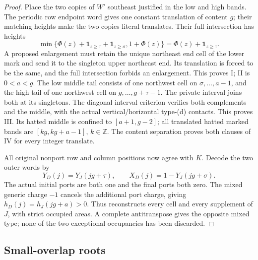\documentclass[11pt,a4paper]{amsart}
\numberwithin{equation}{section}
\theoremstyle{plain}
\theoremstyle{definition}
\newcommand{\Z}{\mathbb Z}
\begin{document}
\begin{proof}
Place the two copies of \(W'\) southeast justified in the low and
high bands.  The periodic row endpoint word gives one constant
translation of content \(g\); their matching heights make the two
copies literal translates.  Their full intersection has heights
\[
 \min\{\Phi(z)+\mathbf1_{z\ge\tau}+\mathbf1_{z\ge\sigma},
                 1+\Phi(z)\}
       =\Phi(z)+\mathbf1_{z\ge\tau}.
\]
A proposed enlargement must retain the unique northeast end cell of the
lower mark and send it to the singleton upper northeast end.  Its
translation is forced to be the same, and the full intersection forbids
an enlargement.  This proves I; II is \(0<a<g\).  The low middle
tail consists of one northwest cell on \(\sigma,\ldots,a-1\), and
the high tail of one northwest cell on \(g,\ldots,g+\tau-1\).
The private interval joins both at its singletons.  The diagonal interval
criterion verifies both complements and the middle, with the actual
vertical/horizontal type-(d) contacts.  This proves III.  Its hatted
middle is confined to \([a+1,g-2]\); all translated hatted marked
bands are \([kg,kg+a-1]\), \(k\in\Z\).  The content separation
proves both clauses of IV for every integer translate.

All original nonport row and column positions now agree with \(K\).
Decode the two outer words by
\[
 Y_D(j)=Y_J(jg+\tau),\qquad
 X_D(j)=1-Y_J(jg+\sigma).
\]
The actual initial ports are both one and the final ports both zero.
The mixed generic charge \(-1\) cancels the additional port charge,
giving \(h_D(j)=h_J(jg+a)>0\).  Thus 
reconstructs every cell and every supplement of \(J\), with strict
occupied areas.  A complete antitranspose gives the opposite mixed type;
none of the two exceptional occupancies has been discarded.
\end{proof}

\subsection{Small-overlap roots}
\end{document}
